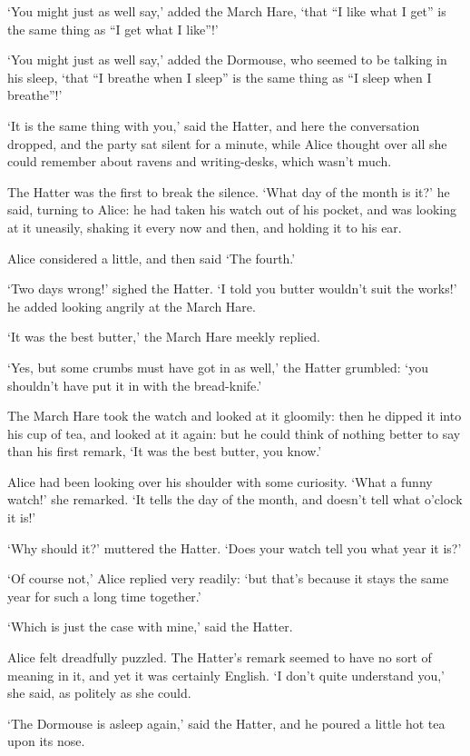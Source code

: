 \documentclass[statementpaper,twoside,openany]{memoir}
\begin{document}
`You might just as well say,' added the March Hare, `that ``I like what I get'' is the same thing as ``I get what I like''!'

`You might just as well say,' added the Dormouse, who seemed to be talking in his sleep, `that ``I breathe when I sleep'' is the same thing as ``I sleep when I breathe''!'

`It is the same thing with you,' said the Hatter, and here the conversation dropped, and the party sat silent for a minute, while Alice thought over all she could remember about ravens and writing-desks, which wasn't much.

The Hatter was the first to break the silence. `What day of the month is it?' he said, turning to Alice: he had taken his watch out of his pocket, and was looking at it uneasily, shaking it every now and then, and holding it to his ear.

Alice considered a little, and then said `The fourth.'

`Two days wrong!' sighed the Hatter. `I told you butter wouldn't suit the works!' he added looking angrily at the March Hare.

`It was the best butter,' the March Hare meekly replied.

`Yes, but some crumbs must have got in as well,' the Hatter grumbled: `you shouldn't have put it in with the bread-knife.'

The March Hare took the watch and looked at it gloomily: then he dipped it into his cup of tea, and looked at it again: but he could think of nothing better to say than his first remark, `It was the best butter, you know.'

Alice had been looking over his shoulder with some curiosity. `What a funny watch!' she remarked. `It tells the day of the month, and doesn't tell what o'clock it is!'

`Why should it?' muttered the Hatter. `Does your watch tell you what year it is?'

`Of course not,' Alice replied very readily: `but that's because it stays the same year for such a long time together.'

`Which is just the case with mine,' said the Hatter.

Alice felt dreadfully puzzled. The Hatter's remark seemed to have no sort of meaning in it, and yet it was certainly English. `I don't quite understand you,' she said, as politely as she could.

`The Dormouse is asleep again,' said the Hatter, and he poured a little hot tea upon its nose.
\end{document}

